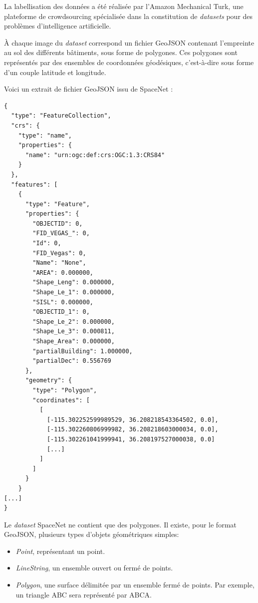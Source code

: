 \documentclass[a4paper, 11pt]{report}
\begin{document}
La labellisation des données a été réalisée par l'Amazon Mechanical Turk, une plateforme de crowdsourcing spécialisée dans la constitution de \emph{datasets} pour des problèmes d'intelligence artificielle.

À chaque image du \emph{dataset} correspond un fichier GeoJSON contenant l'empreinte au sol des différents bâtiments, sous forme de polygones.
Ces polygones sont représentés par des ensembles de coordonnées géodésiques, c'est-à-dire sous forme d'un couple latitude et longitude.

Voici un extrait de fichier GeoJSON issu de SpaceNet :
\begin{verbatim}
{
  "type": "FeatureCollection",
  "crs": {
    "type": "name",
    "properties": {
      "name": "urn:ogc:def:crs:OGC:1.3:CRS84"
    }
  },
  "features": [
    {
      "type": "Feature",
      "properties": {
        "OBJECTID": 0,
        "FID_VEGAS_": 0,
        "Id": 0,
        "FID_Vegas": 0,
        "Name": "None",
        "AREA": 0.000000,
        "Shape_Leng": 0.000000,
        "Shape_Le_1": 0.000000,
        "SISL": 0.000000,
        "OBJECTID_1": 0,
        "Shape_Le_2": 0.000000,
        "Shape_Le_3": 0.000811,
        "Shape_Area": 0.000000,
        "partialBuilding": 1.000000,
        "partialDec": 0.556769
      },
      "geometry": {
        "type": "Polygon",
        "coordinates": [
          [
            [-115.302252599989529, 36.208218543364502, 0.0],
            [-115.302260806999982, 36.208218603000034, 0.0], 
            [-115.302261041999941, 36.208197527000038, 0.0]
            [...]
          ]
        ]
      }
    }
[...]
}
\end{verbatim}
Le \emph{dataset} SpaceNet ne contient que des polygones.
Il existe, pour le format GeoJSON, plusieurs types d'objets géométriques simples:
\begin{itemize}
	\item \emph{Point}, représentant un point.
	\item \emph{LineString}, un ensemble ouvert ou fermé de points.
	\item \emph{Polygon}, une surface délimitée par un ensemble fermé de points. Par exemple, un triangle ABC sera représenté par ABCA.
\end{itemize}
\end{document}
